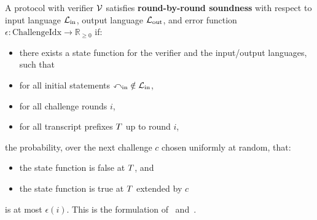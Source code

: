 \begin{definition}
    \label{def:round_by_round_soundness}
    A protocol with verifier \(\mathcal{V}\) satisfies \textbf{round-by-round soundness} with respect to input language
    \(\mathcal{L}_{\mathrm{in}}\), output language \(\mathcal{L}_{\mathrm{out}}\), and error function \(\epsilon: \text{ChallengeIdx} \to \mathbb{R}_{\geq 0}\) if:
    \begin{itemize}
        \item there exists a state function for the verifier and the input/output languages, such that
        \item for all initial statements \(\mathbb{x}_{\text{in}} \notin \mathcal{L}_{\mathrm{in}}\),
        \item for all challenge rounds \(i\),
        \item for all transcript prefixes \(T\) up to round \(i\),
    \end{itemize}
    the probability, over the next challenge \(c\) chosen uniformly at random, that:
    \begin{itemize}
        \item the state function is false at \(T\), and
        \item the state function is true at \(T\) extended by \(c\)
    \end{itemize}
    is at most \(\epsilon(i)\). This is the formulation of~\cite{CCHLRRW19} and~\cite{ABF26}.
    \leanok
\end{definition}

